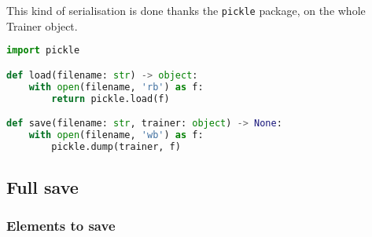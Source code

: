 This kind of serialisation is done thanks the \lstinline!pickle!
package, on the whole Trainer object.

\begin{lstlisting}[language=Python]
import pickle

def load(filename: str) -> object:
    with open(filename, 'rb') as f:
        return pickle.load(f)

def save(filename: str, trainer: object) -> None:
    with open(filename, 'wb') as f:
        pickle.dump(trainer, f)
\end{lstlisting}

\subsection{Full save}

\subsubsection{Elements to save}

